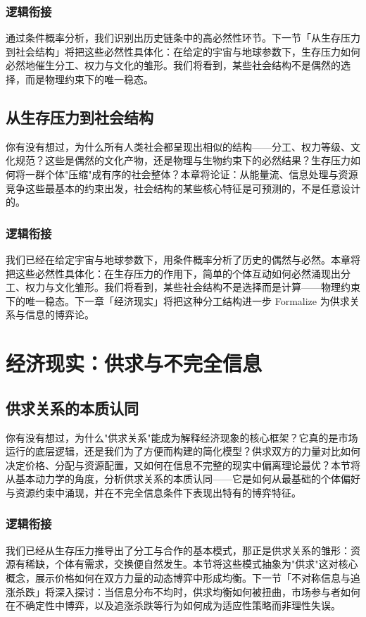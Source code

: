 \documentclass[openany]{book} %
\begin{document}
	\subsection{逻辑衔接}
通过条件概率分析，我们识别出历史链条中的高必然性环节。下一节「从生存压力到社会结构」将把这些必然性具体化：在给定的宇宙与地球参数下，生存压力如何必然地催生分工、权力与文化的雏形。我们将看到，某些社会结构不是偶然的选择，而是物理约束下的唯一稳态。

	\section{从生存压力到社会结构}

	你有没有想过，为什么所有人类社会都呈现出相似的结构——分工、权力等级、文化规范？这些是偶然的文化产物，还是物理与生物约束下的必然结果？生存压力如何将一群个体"压缩"成有序的社会整体？本章将论证：从能量流、信息处理与资源竞争这些最基本的约束出发，社会结构的某些核心特征是可预测的，不是任意设计的。

	\subsection{逻辑衔接}
我们已经在给定宇宙与地球参数下，用条件概率分析了历史的偶然与必然。本章将把这些必然性具体化：在生存压力的作用下，简单的个体互动如何必然涌现出分工、权力与文化雏形。我们将看到，某些社会结构不是选择而是计算——物理约束下的唯一稳态。下一章「经济现实」将把这种分工结构进一步 Formalize 为供求关系与信息的博弈论。

	\chapter{经济现实：供求与不完全信息}
	\section{供求关系的本质认同}

你有没有想过，为什么"供求关系"能成为解释经济现象的核心框架？它真的是市场运行的底层逻辑，还是我们为了方便而构建的简化模型？供求双方的力量对比如何决定价格、分配与资源配置，又如何在信息不完整的现实中偏离理论最优？本节将从基本动力学的角度，分析供求关系的本质认同——它是如何从最基础的个体偏好与资源约束中涌现，并在不完全信息条件下表现出特有的博弈特征。

	\subsection{逻辑衔接}
我们已经从生存压力推导出了分工与合作的基本模式，那正是供求关系的雏形：资源有稀缺，个体有需求，交换便自然发生。本节将这些模式抽象为"供求"这对核心概念，展示价格如何在双方力量的动态博弈中形成均衡。下一节「不对称信息与追涨杀跌」将深入探讨：当信息分布不均时，供求均衡如何被扭曲，市场参与者如何在不确定性中博弈，以及追涨杀跌等行为如何成为适应性策略而非理性失误。
\end{document}
